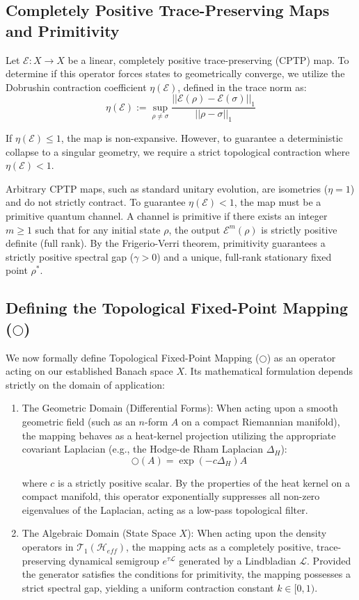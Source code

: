 \documentclass[12pt,openany]{book}
\theoremstyle{plain}
\theoremstyle{definition}
\theoremstyle{remark}
\begin{document}
\subsection{Completely Positive Trace-Preserving Maps and Primitivity}
Let $\mathcal{E}: X \to X$ be a linear, completely positive trace-preserving (CPTP) map. To determine if this operator forces states to geometrically converge, we utilize the Dobrushin contraction coefficient $\eta(\mathcal{E})$, defined in the trace norm as:$$\eta(\mathcal{E}) := \sup_{\rho \ne \sigma} \frac{||\mathcal{E}(\rho) - \mathcal{E}(\sigma)||_1}{||\rho - \sigma||_1}$$

If $\eta(\mathcal{E}) \le 1$, the map is non-expansive. However, to guarantee a deterministic collapse to a singular geometry, we require a strict topological contraction where $\eta(\mathcal{E}) < 1$.

Arbitrary CPTP maps, such as standard unitary evolution, are isometries ($\eta = 1$) and do not strictly contract. To guarantee $\eta(\mathcal{E}) < 1$, the map must be a primitive quantum channel. A channel is primitive if there exists an integer $m \ge 1$ such that for any initial state $\rho$, the output $\mathcal{E}^m(\rho)$ is strictly positive definite (full rank). By the Frigerio-Verri theorem, primitivity guarantees a strictly positive spectral gap ($\gamma > 0$) and a unique, full-rank stationary fixed point $\rho^*$.

\subsection{Defining the Topological Fixed-Point Mapping ($\bigcirc$)} We now formally define Topological Fixed-Point Mapping ($\bigcirc$) as an operator acting on our established Banach space $X$. Its mathematical formulation depends strictly on the domain of application:
\begin{enumerate}
	\item The Geometric Domain (Differential Forms):
When acting upon a smooth geometric field (such as an $n$-form $A$ on a compact Riemannian manifold), the mapping behaves as a heat-kernel projection utilizing the appropriate covariant Laplacian (e.g., the Hodge-de Rham Laplacian $\Delta_H$):
$$\bigcirc(A) = \exp(-c \Delta_H)A$$

where $c$ is a strictly positive scalar. By the properties of the heat kernel on a compact manifold, this operator exponentially suppresses all non-zero eigenvalues of the Laplacian, acting as a low-pass topological filter.

	\item The Algebraic Domain (State Space $X$):
When acting upon the density operators in $\mathcal{T}_1(\mathcal{H}_{eff})$, the mapping acts as a completely positive, trace-preserving dynamical semigroup $e^{\tau \mathcal{L}}$ generated by a Lindbladian $\mathcal{L}$. Provided the generator satisfies the conditions for primitivity, the mapping possesses a strict spectral gap, yielding a uniform contraction constant $k \in [0, 1)$.
\end{enumerate} 
\end{document}
